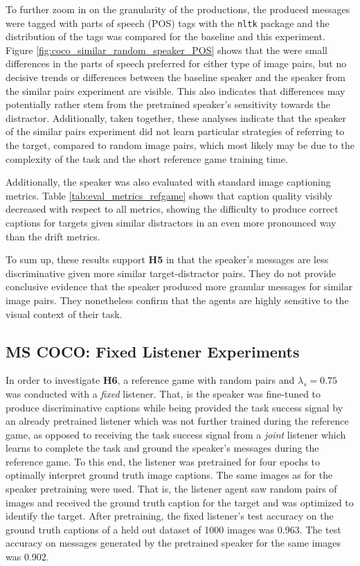 To further zoom in on the granularity of the productions, the produced messages were tagged with parts of speech (POS) tags with the \texttt{nltk} package \parencite{bird2006nltk} and the distribution of the tags was compared for the baseline and this experiment. Figure \ref{fig:coco_similar_random_speaker_POS} shows that the were small differences in the parts of speech preferred for either type of image pairs, but no decisive trends or differences between the baseline speaker and the speaker from the similar pairs experiment are visible. This also indicates that differences may potentially rather stem from the pretrained speaker's sensitivity towards the distractor. Additionally, taken together, these analyses indicate that the speaker of the similar pairs experiment did not learn particular strategies of referring to the target, compared to random image pairs, which most likely may be due to the complexity of the task and the short reference game training time.

Additionally, the speaker was also evaluated with standard image captioning metrics. Table \ref{tab:eval_metrics_refgame} shows that caption quality visibly decreased with respect to all metrics, showing the difficulty to produce correct captions for targets given similar distractors in an even more pronounced way than the drift metrics.

To sum up, these results support \textbf{H5} in that the speaker's messages are less discriminative given more similar target-distractor pairs. They do not provide conclusive evidence that the speaker produced more granular messages for similar image pairs. They nonetheless confirm that the agents are highly sensitive to the visual context of their task.

\subsection{MS COCO: Fixed Listener Experiments}
\label{exp:coco_fixed_listener}
In order to investigate \textbf{H6}, a reference game with random pairs and $\lambda_s=0.75$ was conducted with a \emph{fixed} listener. That, is the speaker was fine-tuned to produce discriminative captions while being provided the task success signal by an already pretrained listener which was not further trained during the reference game, as opposed to receiving the task success signal from a \emph{joint} listener which learns to complete the task and ground the speaker's messages during the reference game. To this end, the listener was pretrained for four epochs to optimally interpret ground truth image captions. The same images as for the speaker pretraining were used. That is, the listener agent saw random pairs of images and received the ground truth caption for the target and was optimized to identify the target. After pretraining, the fixed listener's test accuracy on the ground truth captions of a held out dataset of 1000 images was 0.963. The test accuracy on messages generated by the pretrained speaker for the same images was 0.902.

